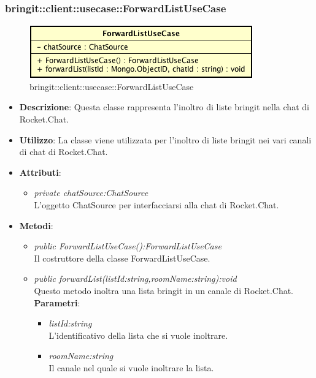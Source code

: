\subsubsection{bringit::client::usecase::ForwardListUseCase}

\label{bringit::client::usecase::ForwardListUseCase}
\begin{figure}[H]
	\centering
	\includegraphics[scale=0.5]{Sezioni/SottosezioniST/img/app/ForwardListUseCase.png}
	\caption{bringit::client::usecase::ForwardListUseCase}
\end{figure}

\begin{itemize}
\item \textbf{Descrizione}: Questa classe rappresenta l'inoltro di liste bringit nella chat di Rocket.Chat.
\item \textbf{Utilizzo}: La classe viene utilizzata per l'inoltro di liste bringit nei vari canali di chat di Rocket.Chat.
\item \textbf{Attributi}: 
	\begin{itemize}
	\item \textit{private chatSource:ChatSource}\\
	L'oggetto ChatSource per interfacciarsi alla chat di Rocket.Chat.
	\end{itemize}
\item \textbf{Metodi}:
	\begin{itemize}
	\item \textit{public ForwardListUseCase():ForwardListUseCase}\\
	Il costruttore della classe ForwardListUseCase.
	\item \textit{public forwardList(listId:string,roomName:string):void}\\
	Questo metodo inoltra una lista bringit in un canale di Rocket.Chat.
			\\ \textbf{Parametri}: \begin{itemize}
				\item \textit{listId:string}\\
				L'identificativo della lista che si vuole inoltrare.
				\item \textit{roomName:string}\\
				Il canale  nel quale si vuole inoltrare la lista.
			\end{itemize}
	\end{itemize}
\end{itemize} 

